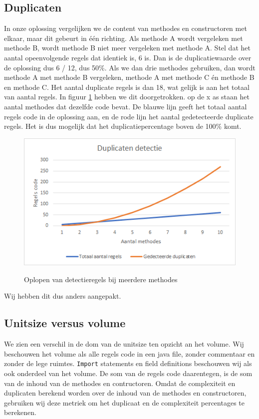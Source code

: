 \documentclass[a4paper]{article}
\begin{document}
\subsection{Duplicaten}
In onze oplossing vergelijken we de content van methodes en constructoren met elkaar, maar dit gebeurt in één richting. Als methode A wordt vergeleken met methode B, wordt methode B niet meer vergeleken met methode A. Stel dat het aantal opeenvolgende regels dat identiek is, 6 is. Dan is de duplicatiewaarde over de oplossing dus 6 / 12, dus 50\%. Als we dan drie methodes gebruiken, dan wordt methode A met methode B vergeleken, methode A met methode C én methode B en methode C. Het aantal duplicate regels is dan 18, wat gelijk is aan het totaal van aantal regels. In figuur \ref{fig:DuplicatenDetectie} hebben we dit doorgetrokken. op de x as staan het aantal methodes dat dezelfde code bevat. De blauwe lijn geeft het totaal aantal regels code in de oplossing aan, en de rode lijn het aantal gedetecteerde duplicate regels. Het is dus mogelijk dat het duplicatiepercentage boven de 100\% komt.
\begin{figure}[htbp]
\caption{Oplopen van detectieregels bij meerdere methodes}
\centering
\includegraphics[width=0.8 \textwidth]{DuplicatenDetectie.png}
\label{fig:DuplicatenDetectie}
\end{figure}
Wij hebben dit dus anders aangepakt. 

\subsection{Unitsize versus volume}
We zien een verschil in de dom van de unitsize ten opzicht an het volume. Wij beschouwen het volume als alle regels code in een java file, zonder commentaar en zonder de lege ruimtes. \texttt{Import} statements en field definitions beschouwen wij als ook onderdeel van het volume. De som van de regels code daarentegen, is de som van de inhoud van de methodes en contructoren. Omdat de complexiteit en duplicaten berekend worden over de inhoud van de methodes en constructoren, gebruiken wij deze metriek om het duplicaat en de complexiteit percentages te berekenen.
\end{document}
